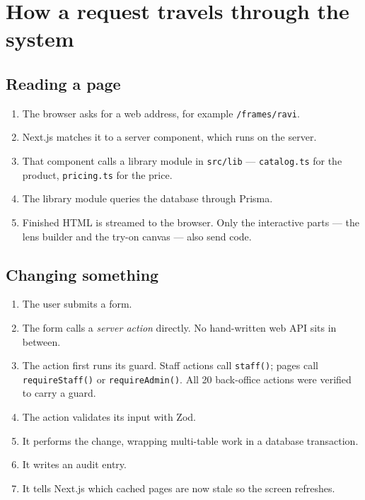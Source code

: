 \documentclass[11pt,a4paper]{report}
\newcommand{\code}[1]{\texttt{\small #1}}
\begin{document}
\chapter{How a request travels through the system}

\section{Reading a page}

\begin{enumerate}
  \item The browser asks for a web address, for example \code{/frames/ravi}.
  \item Next.js matches it to a server component, which runs on the server.
  \item That component calls a library module in \code{src/lib} ---
        \code{catalog.ts} for the product, \code{pricing.ts} for the price.
  \item The library module queries the database through Prisma.
  \item Finished HTML is streamed to the browser. Only the interactive parts
        --- the lens builder and the try-on canvas --- also send code.
\end{enumerate}

\section{Changing something}

\begin{enumerate}
  \item The user submits a form.
  \item The form calls a \emph{server action} directly. No hand-written web
        API sits in between.
  \item The action first runs its guard. Staff actions call \code{staff()};
        pages call \code{requireStaff()} or \code{requireAdmin()}. All 20
        back-office actions were verified to carry a guard.
  \item The action validates its input with Zod.
  \item It performs the change, wrapping multi-table work in a database
        transaction.
  \item It writes an audit entry.
  \item It tells Next.js which cached pages are now stale so the screen
        refreshes.
\end{enumerate}
\end{document}
